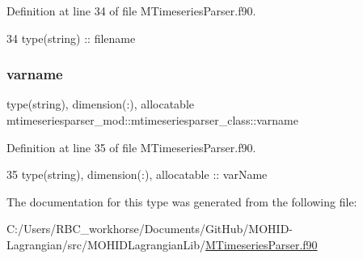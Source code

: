Definition at line 34 of file M\+Timeseries\+Parser.\+f90.


\begin{DoxyCode}
34         \textcolor{keywordtype}{type}(string) :: filename
\end{DoxyCode}
\mbox{\label{structmtimeseriesparser__mod_1_1mtimeseriesparser__class_a163c0d7ab75a303626ac7b73ed47e70c}} 
\subsubsection{\texorpdfstring{varname}{varname}}
{\footnotesize\ttfamily type(string), dimension(\+:), allocatable mtimeseriesparser\+\_\+mod\+::mtimeseriesparser\+\_\+class\+::varname\hspace{0.3cm}{\ttfamily [private]}}



Definition at line 35 of file M\+Timeseries\+Parser.\+f90.


\begin{DoxyCode}
35         \textcolor{keywordtype}{type}(string), \textcolor{keywordtype}{dimension(:)}, \textcolor{keywordtype}{allocatable} :: varName
\end{DoxyCode}


The documentation for this type was generated from the following file\+:\begin{DoxyCompactItemize}
\item 
C\+:/\+Users/\+R\+B\+C\+\_\+workhorse/\+Documents/\+Git\+Hub/\+M\+O\+H\+I\+D-\/\+Lagrangian/src/\+M\+O\+H\+I\+D\+Lagrangian\+Lib/\mbox{\hyperlink{_m_timeseries_parser_8f90}{M\+Timeseries\+Parser.\+f90}}\end{DoxyCompactItemize}
